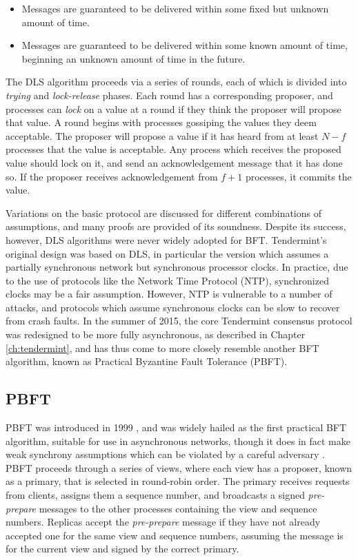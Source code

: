 \begin{itemize}
\item{Messages are guaranteed to be delivered within some fixed but unknown amount of time.}
\item{Messages are guaranteed to be delivered within some known amount of time, beginning an unknown amount of time in the future.}
\end{itemize}

The DLS algorithm proceeds via a series of rounds, each of which is divided into \emph{trying} and \emph{lock-release} phases.
Each round has a corresponding proposer, and processes can \emph{lock} on a value at a round if they think
the proposer will propose that value.
A round begins with processes gossiping the values they deem acceptable.
The proposer will propose a value if it has heard from at least $N - f$ processes that the value is acceptable.
Any process which receives the proposed value should lock on it, and send an acknowledgement message
that it has done so.
If the proposer receives acknowledgement from $f+1$ processes, it commits the value.

Variations on the basic protocol are discussed for different combinations of assumptions,
and many proofs are provided of its soundness.
Despite its success, however, DLS algorithms were never widely adopted for BFT.
Tendermint's original design was based on DLS, in particular the version which assumes
a partially synchronous network but synchronous processor clocks.
In practice, due to the use of protocols like the Network Time Protocol (NTP), 
synchronized clocks may be a fair assumption.
However, NTP is vulnerable to a number of attacks,
and protocols which assume synchronous clocks can be slow to recover from crash faults.
In the summer of 2015, the core Tendermint consensus protocol was redesigned to be more fully asynchronous,
as described in Chapter \ref{ch:tendermint},
and has thus come to more closely resemble another BFT algorithm,
known as Practical Byzantine Fault Tolerance (PBFT).

\subsection{PBFT}

PBFT was introduced in 1999 \cite{pbft}, and was widely hailed as the first practical BFT algorithm,
suitable for use in asynchronous networks,
though it does in fact make weak synchrony assumptions which can be violated by a careful adversary \cite{honeybadger}.
PBFT proceeds through a series of views, 
where each view has a proposer, known as a primary,
that is selected in round-robin order.
The primary receives requests from clients,
assigns them a sequence number, and broadcasts a signed \emph{pre-prepare}
messages to the other processes containing the view and sequence numbers.
Replicas accept the \emph{pre-prepare} message if they have not already accepted one for the same
view and sequence numbers, assuming the message is for the current view and signed by the correct primary.

